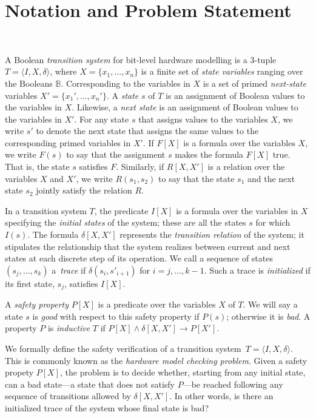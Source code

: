 \section{Notation and Problem Statement}~\label{sec:notation}

A Boolean \textit{transition system} for bit-level hardware
modelling is a 3-tuple $T = \langle I,X,\delta \rangle$, where $X = \{x_1,\dots ,x_n\}$
is a finite set of \textit{state variables} ranging over the Booleans $\mathbb{B}$. 
%
Corresponding to the variables in $X$ is a set of primed \textit{next-state} variables  $X' = \{x_1', \dots, x_n'\}$.
% 
A \textit{state} $s$ of $T$ is an assignment of Boolean values to the variables in $X$. Likewise, a \textit{next state} is an assignment of Boolean values to the variables in $X'$.  For any state $s$ that assigns values to the  variables $X$, we write $s'$ to denote the next state that assigns the same values to the corresponding primed variables in $X'$. If $F[X]$ is a formula over the variables $X$, we write $F(s)$ to say that
the assignment $s$ makes the formula $F[X]$ true. That is, the state $s$ satisfies $F$. Similarly, if $R[X,X']$ is a relation over the variables $X$ and $X'$, we write $R(s_1,s_2)$ to say that the state $s_1$ and the next state $s_2$ jointly satisfy the relation $R$.

In a transition system $T$, the predicate $I[X]$ is a formula over
the variables in $X$ specifying the \textit{initial states} of the system; these are all the states $s$ for which
$I(s)$. The formula $\delta[X,X']$ represents the \textit{transition relation} of the system; it stipulates the relationship that the system 
realizes between current and next states at each discrete step of its operation. 
% 
We call a sequence of states $(s_j,\dots,s_k)$ a~\textit{trace} 
if $\delta(s_i,s'_{i{+}1})$ for $i=j,\dots,k-1$.  Such a trace is 
\textit{initialized} if its first state, $s_j$, satisfies $I[X]$.  
  
A \textit{safety property} $P[X]$ is a predicate over the variables $X$ of $T$.  We will say a state $s$ is \textit{good} with respect to this safety property if 
$P(s)$; otherwise it is \textit{bad}. A property $P$ is \textit{inductive} $T$ if $P[X] \wedge \delta[X,X'] \rightarrow P[X']$.    
%

We formally define the safety verification of a transition system~$T = \langle I,X,\delta\rangle$.
This is commonly known as the \textit{hardware model checking problem}.  
Given a safety propety $P[X]$, the problem is to decide whether, starting from any initial state, can a bad state---a state that does not satisfy $P$---be reached following any sequence of transitions allowed by $\delta[X,X']$. In other words, is there an initialized trace of the system whose
final state is bad?
%
